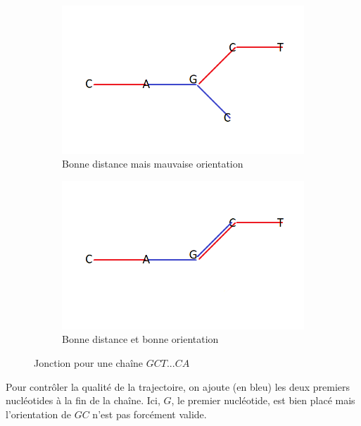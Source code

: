\documentclass[graphics]{beamer}
\begin{document}
\begin{frame}
	\begin{figure}[H]
		\centering
		\begin{subfigure}[b]{0.4\textwidth}
			\centering
			\includegraphics[width=\textwidth]{pb_angle}
			\caption{Bonne distance mais mauvaise orientation}
			\label{fig:y equals x}
		\end{subfigure}
		\begin{subfigure}[b]{0.4\textwidth}
			\centering
			\includegraphics[width=\textwidth]{angle_oui}
			\caption{Bonne distance et bonne orientation}
			\label{fig:three sin x}
		\end{subfigure}
		\caption{Jonction pour une chaîne $GCT...CA$}
		\label{fig:three graphs}
	\end{figure}
Pour contrôler la qualité de la trajectoire, on ajoute (en bleu) les deux premiers nucléotides à la fin de la chaîne. Ici, $G$, le premier nucléotide, est bien placé mais l'orientation de $GC$ n'est pas forcément valide.
\end{frame}
\end{document}
